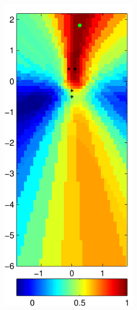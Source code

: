 \documentclass[spanish,openright]{book}
\begin{document}
\begin{figure}
\begin{subfigure}[t]{0.47\textwidth}
\begin{minipage}[t]{\textwidth}
\begin{subfigure}[t]{0.3\textwidth}
\label{fig:Pattern_Fo1500_pos08}
\end{subfigure}
\begin{subfigure}[t]{0.3\textwidth}
\includegraphics[width=\textwidth]{SRP_Fo1500_frame1127_pos08}

\end{subfigure}
\end{minipage}
\end{subfigure}
\end{figure}
\end{document}
